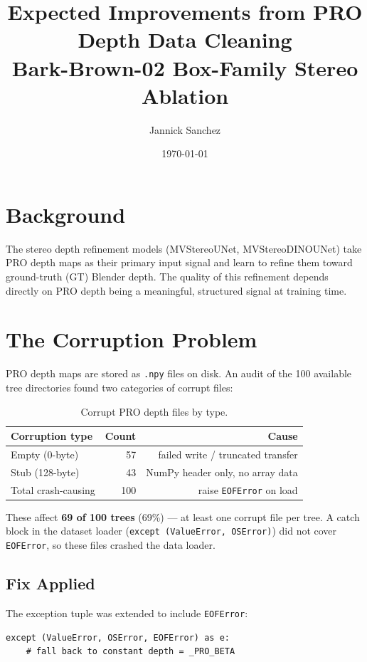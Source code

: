 \documentclass[11pt]{article}
\title{Expected Improvements from PRO Depth Data Cleaning\\
       \large Bark-Brown-02 Box-Family Stereo Ablation}
\author{Jannick Sanchez}
\date{\today}
\begin{document}
\maketitle

\section{Background}

The stereo depth refinement models (MVStereoUNet, MVStereoDINOUNet) take
PRO depth maps as their primary input signal and learn to refine them
toward ground-truth (GT) Blender depth.  The quality of this refinement
depends directly on PRO depth being a meaningful, structured signal at
training time.

\section{The Corruption Problem}

PRO depth maps are stored as \texttt{.npy} files on disk.  An audit of
the 100 available tree directories found two categories of corrupt files:

\begin{table}[h!]
\centering
\begin{tabular}{lrr}
\toprule
Corruption type & Count & Cause \\
\midrule
Empty (0-byte)    & 57 & failed write / truncated transfer \\
Stub (128-byte)   & 43 & NumPy header only, no array data \\
\midrule
Total crash-causing & 100 & raise \texttt{EOFError} on load \\
\bottomrule
\end{tabular}
\caption{Corrupt PRO depth files by type.}
\end{table}

These affect \textbf{69 of 100 trees} (69\%) — at least one corrupt file
per tree.  A catch block in the dataset loader (\texttt{except (ValueError,
OSError)}) did not cover \texttt{EOFError}, so these files crashed the data
loader.

\subsection*{Fix Applied}

The exception tuple was extended to include \texttt{EOFError}:
\begin{verbatim}
except (ValueError, OSError, EOFError) as e:
    # fall back to constant depth = _PRO_BETA
\end{verbatim}
\end{document}
